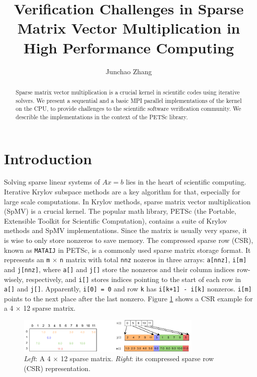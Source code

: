 \documentclass[submission]{eptcs}
\title{Verification Challenges in Sparse Matrix Vector Multiplication in High Performance Computing}
\author{Junchao Zhang
\institute{Argonne National Laboratory, Illinois, USA}
\email{jczhang@anl.gov}
}
\begin{document}
\maketitle

\begin{abstract}
Sparse matrix vector multiplication is a crucial kernel in scientific codes
using iterative solvers. We present a sequential and a basic MPI parallel implementations of
the kernel on the CPU, to provide challenges to the scientific software verification community.
We describle the implementations
in the context of the PETSc library.
\end{abstract}

\section{Introduction}
Solving sparse linear systems of $Ax=b$ lies in the heart of scientific computing.
Iterative Krylov subspace methods \cite{saad2003iterative} are a key algorithm for that,
especially for large scale computations.
In Krylov methods, sparse matrix vector multiplication (SpMV) is a crucial kernel.
The popular math library, PETSc (the Portable, Extensible Toolkit for Scientific Computation)\cite{petsc-user-ref}, contains
a suite of Krylov methods and SpMV implementations.
Since the matrix is usually very sparse,
it is wise to only store nonzeros to save memory.
The compressed sparse row (CSR), known as {\tt MATAIJ} in PETSc,
is a commonly used sparse matrix storage format.
It represents an {\tt m} $\times$ {\tt n} matrix with total {\tt nnz} nozeros in three arrays: {\tt a[nnz]}, {\tt i[m]} and {\tt j[nnz]},
 where {\tt a[]} and {\tt j[]} store the nonzeros and their column indices row-wisely, respectively, and {\tt i[]}
stores indices pointing to the start of each row in {\tt a[]} and {\tt j[]}.
Apparently, {\tt i[0] = 0} and row {\tt k} has {\tt i[k+1] - i[k]} nonzeros. {\tt i[m]} points to the next place
after the last nonzero. Figure \ref{fig:seqcsr} shows a CSR example for a 4 $\times$ 12 sparse matrix.

\begin{figure}[h]
  \centering
  \includegraphics[width=0.8\textwidth]{figs/SEQCSR.pdf}
  \caption{{\it Left}: A 4 $\times$ 12 sparse matrix. {\it Right}:  its compressed sparse row (CSR) representation.}
  \label{fig:seqcsr}
\end{figure}
\end{document}
